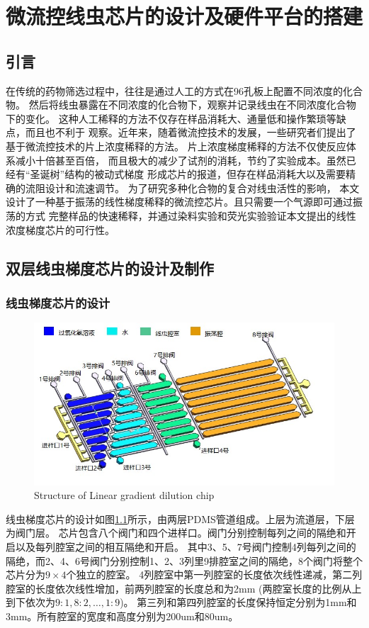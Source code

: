 \chapter{微流控线虫芯片的设计及硬件平台的搭建}
\section{引言}
	
	在传统的药物筛选过程中，往往是通过人工的方式在96孔板上配置不同浓度的化合物。
	然后将线虫暴露在不同浓度的化合物下，观察并记录线虫在不同浓度化合物下的变化。
	这种人工稀释的方法不仅存在样品消耗大、通量低和操作繁琐等缺点，而且也不利于
	观察。近年来，随着微流控技术的发展，一些研究者们提出了基于微流控技术的片上浓度稀释的方法。
	片上浓度梯度稀释的方法不仅使反应体系减小十倍甚至百倍，
	而且极大的减少了试剂的消耗，节约了实验成本。虽然已经有“圣诞树”结构的被动式梯度
	形成芯片的报道，但存在样品消耗大以及需要精确的流阻设计和流速调节。
	为了研究多种化合物的复合对线虫活性的影响，
	本文设计了一种基于振荡的线性梯度稀释的微流控芯片。且只需要一个气源即可通过振荡的方式
	完整样品的快速稀释，并通过染料实验和荧光实验验证本文提出的线性浓度梯度芯片的可行性。
	
\section{双层线虫梯度芯片的设计及制作}
\subsection{线虫梯度芯片的设计}
\label{arch-design}
\begin{figure}[htbp]
	  \centering
	  \includegraphics[width=13cm]{figure/chap2/chip-arch.jpg}
		{Structure of Linear gradient dilution chip}
	  \label{fig:chap2:chip-arch}
	\end{figure}
线虫梯度芯片的设计如图\ref{fig:chap2:chip-arch}所示，由两层PDMS管道组成。上层为流道层，下层为阀门层。
芯片包含八个阀门和四个进样口。阀门分别控制每列之间的隔绝和开启以及每列腔室之间的相互隔绝和开启。
其中3、5、7号阀门控制4列每列之间的隔绝，而2、4、6号阀门分别控制1、2、3列里9排腔室之间的隔绝，8个阀门将整个芯片分为$9\times4$个独立的腔室。
4列腔室中第一列腔室的长度依次线性递减，第二列腔室的长度依次线性增加，前两列腔室的长度总和为2mm (两腔室长度的比例从上到下依次为$9:1,8:2,\dots,1:9$)。
第三列和第四列腔室的长度保持恒定分别为1mm和3mm。所有腔室的宽度和高度分别为200um和80um。

